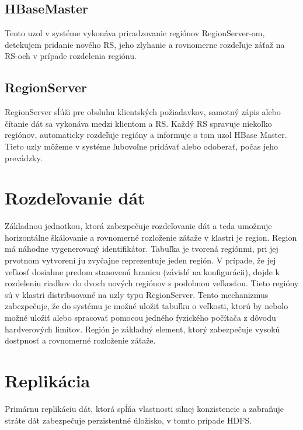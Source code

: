 \documentclass[11pt,twoside,a4paper]{book}
\begin{document}

\subsection*{HBaseMaster}

Tento uzol v systéme vykonáva priradzovanie regiónov RegionServer-om, detekujem pridanie nového RS, jeho zlyhanie a rovnomerne rozdeľuje záťaž na RS-och v prípade rozdelenia regiónu.

\subsection*{RegionServer}

RegionServer sĺúži pre obsluhu klientských požiadavkov, samotný zápis alebo čítanie dát sa vykonáva medzi klientom a RS. Každý RS spravuje niekoľko regiónov, automaticky rozdeľuje regióny a informuje o tom uzol HBase Master. Tieto uzly môžeme v systéme ľubovoľne pridávať alebo odoberať, počas jeho prevádzky.


\section{Rozdeľovanie dát}

Základnou jednotkou, ktorá zabezpečuje rozdeľovanie dát a teda umožnuje horizontálne škálovanie a rovnomerné rozloženie záťaže v klastri je region. Region má náhodne vygenerovaný identifikátor. Tabuľka je tvorená regiónmi, pri jej prvotnom vytvorení ju zvyčajne reprezentuje jeden región. V prípade, že jej veľkosť dosiahne predom stanovenú hranicu (závislé na konfigurácii), dojde k rozdeleniu riadkov do dvoch nových regiónov s podobnou veľkosťou. Tieto regióny sú  v klastri distribuované na uzly typu RegionServer. Tento mechanizmus zabezpečuje, že do systému je možné uložiť tabuľku o veľkosti, ktorú by nebolo možné uložiť alebo spracovať pomocou jedného fyzického počítača z dôvodu hardverových limitov. Región je základný element, ktorý zabezpečuje vysokú dostpnosť a rovnomerné rozloženie záťaže.

\section{Replikácia}
Primárnu replikáciu dát, ktorá spĺňa vlastnosti silnej konzistencie a zabraňuje stráte dát zabezpečuje perzistentné úložisko, v tomto prípade HDFS.
\end{document}
